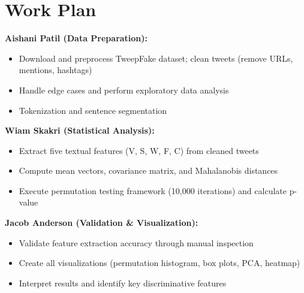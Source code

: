 \section*{Work Plan}

\textbf{Aishani Patil (Data Preparation):}
\begin{itemize}
    \item Download and preprocess TweepFake dataset; clean tweets (remove URLs, mentions, hashtags)
    \item Handle edge cases and perform exploratory data analysis
    \item Tokenization and sentence segmentation
\end{itemize}

\textbf{Wiam Skakri (Statistical Analysis):}
\begin{itemize}
    \item Extract five textual features (V, S, W, F, C) from cleaned tweets
    \item Compute mean vectors, covariance matrix, and Mahalanobis distances
    \item Execute permutation testing framework (10,000 iterations) and calculate p-value
\end{itemize}

\textbf{Jacob Anderson (Validation \& Visualization):}
\begin{itemize}
    \item Validate feature extraction accuracy through manual inspection
    \item Create all visualizations (permutation histogram, box plots, PCA, heatmap)
    \item Interpret results and identify key discriminative features
\end{itemize}

